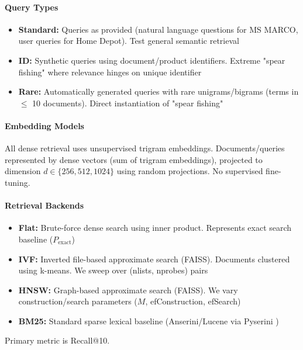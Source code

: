 \documentclass[conference,anonymous]{IEEEtran}
\begin{document}
\paragraph{Query Types}
\begin{itemize}
\item \textbf{Standard:} Queries as provided (natural language questions for MS MARCO, user queries for Home Depot). Test general semantic retrieval

\item \textbf{ID:} Synthetic queries using document/product identifiers. Extreme "spear fishing" where relevance hinges on unique identifier

\item \textbf{Rare:} Automatically generated queries with rare unigrams/bigrams (terms in $\leq$ 10 documents). Direct instantiation of "spear fishing"
\end{itemize}

\paragraph{Embedding Models}
All dense retrieval uses unsupervised trigram embeddings. Documents/queries represented by dense vectors (sum of trigram embeddings), projected to dimension $d \in \{256, 512, 1024\}$ using random projections. No supervised fine-tuning.

\paragraph{Retrieval Backends}
\begin{itemize}
\item \textbf{Flat:} Brute-force dense search using inner product. Represents exact search baseline ($P_{\text{exact}}$)

\item \textbf{IVF:} Inverted file-based approximate search (FAISS). Documents clustered using k-means. We sweep over (nlists, nprobes) pairs

\item \textbf{HNSW:} Graph-based approximate search (FAISS). We vary construction/search parameters ($M$, efConstruction, efSearch)

\item \textbf{BM25:} Standard sparse lexical baseline (Anserini/Lucene via Pyserini \cite{lin2021pyserini})
\end{itemize}

Primary metric is Recall@10.
\end{document}
